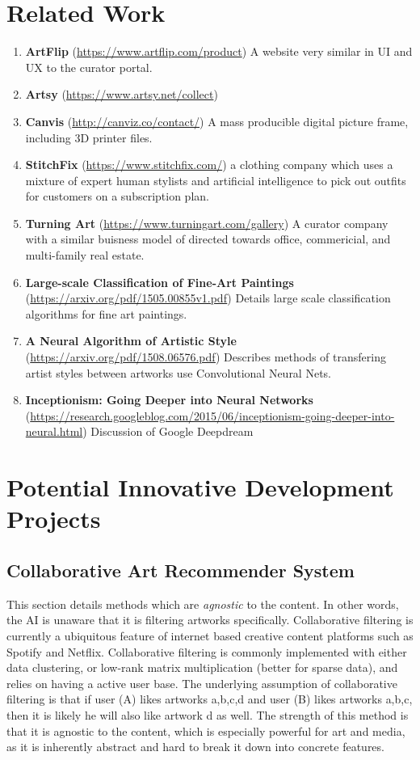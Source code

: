 \documentclass[fontsize=12pt]{scrartcl} %
\begin{document}
\section{Related Work}
\begin{enumerate}
    \item\textbf{ArtFlip} (\url{https://www.artflip.com/product}) A website very similar in UI and UX to the curator portal.
    \item\textbf{Artsy}  (\url{https://www.artsy.net/collect})
    \item\textbf{Canvis} (\url{http://canviz.co/contact/})  A mass producible digital picture frame, including 3D printer files.
    \item\textbf{StitchFix} (\url{https://www.stitchfix.com/})  a clothing company which uses a mixture of expert human stylists and artificial intelligence to pick out outfits for customers on a subscription plan.
    \item\textbf{Turning Art} (\url{https://www.turningart.com/gallery}) A curator company with a similar buisness model of directed towards office, commericial, and multi-family real estate.
    \item\textbf{Large-scale Classification of Fine-Art Paintings} (\url{https://arxiv.org/pdf/1505.00855v1.pdf}) Details large scale classification algorithms for fine art paintings.
    \item\textbf{A Neural Algorithm of Artistic Style} (\url{https://arxiv.org/pdf/1508.06576.pdf}) Describes methods of transfering artist styles between artworks use Convolutional Neural Nets.
    \item\textbf{Inceptionism: Going Deeper into Neural Networks} (\url{https://research.googleblog.com/2015/06/inceptionism-going-deeper-into-neural.html}) Discussion of Google Deepdream
\end{enumerate}

\section{Potential Innovative Development Projects}
\subsection{Collaborative Art Recommender System}
 This section details methods which are \textit{agnostic} to the content. In other words, the AI is unaware that it is filtering artworks specifically. Collaborative filtering is currently a ubiquitous feature of internet based creative content platforms such as Spotify and Netflix. Collaborative filtering is commonly implemented with either data clustering, or low-rank matrix multiplication (better for sparse data), and relies on having a active user base. The underlying assumption of collaborative filtering is that if user (A) likes artworks {a,b,c,d} and user (B) likes artworks {a,b,c}, then it is likely he will also like artwork {d} as well. The strength of this method is that it is agnostic to the content, which is especially powerful for art and media, as it is inherently abstract and hard to break it down into concrete features.
\end{document}
